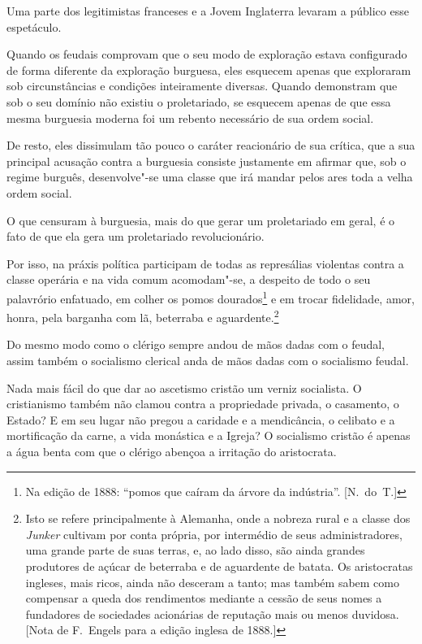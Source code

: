 Uma parte dos legitimistas franceses e a Jovem Inglaterra levaram a
público esse espetáculo.

Quando os feudais comprovam que o seu modo de exploração estava
configurado de forma diferente da exploração burguesa, eles esquecem
apenas que exploraram sob circunstâncias e condições inteiramente
diversas. Quando demonstram que sob o seu domínio não existiu o
proletariado, se esquecem apenas de que essa mesma burguesia
moderna foi um rebento necessário de sua ordem social.

De resto, eles dissimulam tão pouco o caráter reacionário de sua crítica,
que a sua principal acusação contra a burguesia consiste justamente em
afirmar que, sob o regime burguês, desenvolve"-se uma classe que irá
mandar pelos ares toda a velha ordem social.

O que censuram à burguesia, mais do que gerar um proletariado em geral,
é o fato de que ela gera um proletariado revolucionário.

Por isso, na práxis política participam de todas as represálias
violentas contra a classe operária e na vida comum acomodam"-se, a
despeito de todo o seu palavrório enfatuado, em colher os pomos
dourados\footnote{ Na edição de 1888: “pomos que caíram da árvore da indústria”. [N.~do~T.]} e em trocar fidelidade, amor, honra, pela barganha com lã,
beterraba e
aguardente.\footnote{ Isto se refere principalmente à Alemanha, onde 
a nobreza rural e a classe dos \textit{Junker} cultivam por conta própria, 
por intermédio de seus administradores, uma grande parte de suas terras, 
e, ao lado disso, são ainda grandes produtores de açúcar de beterraba e 
de aguardente de batata. Os aristocratas ingleses, mais ricos, ainda não desceram 
a tanto; mas também sabem como compensar a queda dos rendimentos mediante 
a cessão de seus nomes a fundadores de sociedades acionárias de reputação 
mais ou menos duvidosa. [Nota de F.~Engels para a edição inglesa de 1888.]}

Do mesmo modo como o clérigo sempre andou de mãos dadas com o feudal,
assim também o socialismo clerical anda de mãos dadas com o socialismo
feudal.

Nada mais fácil do que dar ao ascetismo cristão um verniz socialista. O
cristianismo também não clamou contra a propriedade privada, o
casamento, o Estado? E em seu lugar não pregou a caridade e a
mendicância, o celibato e a mortificação da carne, a vida monástica e a
Igreja? O socialismo cristão é apenas a água benta com que o clérigo
abençoa a irritação do aristocrata.

